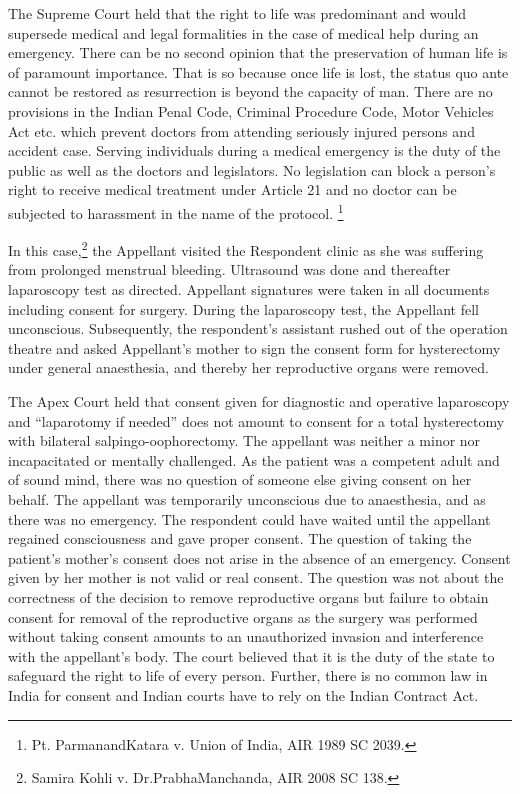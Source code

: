 \begin{multicols}{2}
\noi
The Supreme Court held that the right to life was predominant and would supersede medical and
legal formalities in the case of medical help during an emergency. There can be no second opinion
that the preservation of human life is of paramount importance. That is so because once life is
lost, the status quo ante cannot be restored as resurrection is beyond the capacity of man. There
are no provisions in the Indian Penal Code, Criminal Procedure Code, Motor Vehicles Act etc.
which prevent doctors from attending seriously injured persons and accident case. Serving
individuals during a medical emergency is the duty of the public as well as the doctors and
legislators. No legislation can block a person’s right to receive medical treatment under Article
21 and no doctor can be subjected to harassment in the name of the protocol. \footnote{Pt. ParmanandKatara v. Union of India, AIR 1989 SC 2039.}


\vspace{-.1cm}

\noi
In this case,\footnote{Samira Kohli v. Dr.PrabhaManchanda, AIR 2008 SC 138.} the Appellant visited the Respondent clinic as she was suffering from prolonged
menstrual bleeding. Ultrasound was done and thereafter laparoscopy test as directed. Appellant
signatures were taken in all documents including consent for surgery. During the laparoscopy
test, the Appellant fell unconscious. Subsequently, the respondent’s assistant rushed out of the
operation theatre and asked Appellant’s mother to sign the consent form for hysterectomy under
general anaesthesia, and thereby her reproductive organs were removed.

\noi
The Apex Court held that consent given for diagnostic and operative laparoscopy and
“laparotomy if needed” does not amount to consent for a total hysterectomy with bilateral
salpingo-oophorectomy. The appellant was neither a minor nor incapacitated or mentally
challenged. As the patient was a competent adult and of sound mind, there was no question of
someone else giving consent on her behalf. The appellant was temporarily unconscious due to
anaesthesia, and as there was no emergency. The respondent could have waited until the appellant
regained consciousness and gave proper consent. The question of taking the patient's mother's
consent does not arise in the absence of an emergency. Consent given by her mother is not valid
or real consent. The question was not about the correctness of the decision to remove reproductive
organs but failure to obtain consent for removal of the reproductive organs as the surgery was
performed without taking consent amounts to an unauthorized invasion and interference with the
appellant's body. The court believed that it is the duty of the state to safeguard the right to life of
every person. Further, there is no common law in India for consent and Indian courts have to rely
on the Indian Contract Act.


\end{multicols}
